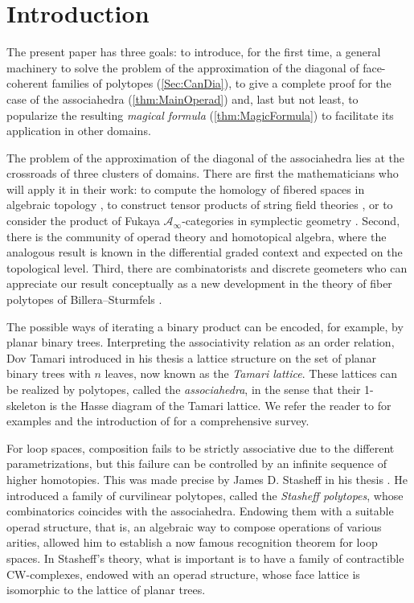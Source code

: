 \Changel
\vspace*{-2\baselineskip}\vskip0pt\enlargethispage{.5\baselineskip}%
\section*{Introduction}

The present paper has three goals: to introduce, for the first time, a general machinery to solve the problem of the approximation of the diagonal of face-coherent families of polytopes (\cref{Sec:CanDia}), to give a complete proof for the case of the associahedra (\cref{thm:MainOperad}) and, last but not least, to popularize the resulting \emph{magical formula} (\cref{thm:MagicFormula}) to facilitate its application in other domains.

The problem of the approximation of the diagonal of the associahedra lies at the crossroads of three clusters of domains.
There are first the mathematicians who will apply it in their work:
to compute the homology of fibered spaces in algebraic topology \cite{Brown59, Proute11}, to construct tensor products of string field theories
\cite{GaberdielZwiebach97}, or to consider the product of Fukaya $\mathcal{A}_\infty$-categories in symplectic geometry \cite{Seidel08, Amorim17}. Second, there is the community of operad theory and homotopical algebra, where the analogous result is known in the differential graded context \cite{SaneblidzeUmble04, MarklShnider06} and expected on the topological level. Third, there are combinatorists and discrete geometers who can appreciate our result conceptually as a new development in the theory of fiber polytopes of Billera--Sturmfels \cite{BilleraSturmfels92}.

The possible ways of iterating a binary product can be encoded, for example, by planar binary trees. Interpreting the associativity relation as an order relation, Dov Tamari introduced in his thesis \cite{Tamari51} a lattice structure on the set of planar binary trees with $n$ leaves, now known as the \emph{Tamari lattice}. These lattices can be realized by polytopes, called the \emph{associahedra}, in the sense that their 1-skeleton is the Hasse diagram of the Tamari lattice. We refer the reader to \cite{CFZ02, GKZ08, Loday04a} for examples and the introduction of \cite{CSZ15} for a comprehensive survey.

For loop spaces, composition fails to be strictly associative due to the different parametrizations, but this failure can be controlled by an infinite sequence of higher homotopies. This was made precise by James D. Stasheff in his thesis \cite{Stasheff63}. He introduced a family of curvilinear polytopes, called the \emph{Stasheff polytopes}, whose combinatorics coincides with the associahedra. Endowing them with a suitable operad structure, that is, an algebraic way to compose operations of various arities, allowed him to establish a now famous recognition theorem for loop spaces. In Stasheff's theory, what is important is to have
a family of contractible CW-complexes, endowed with an operad structure, whose face lattice is isomorphic to the lattice of planar trees.

